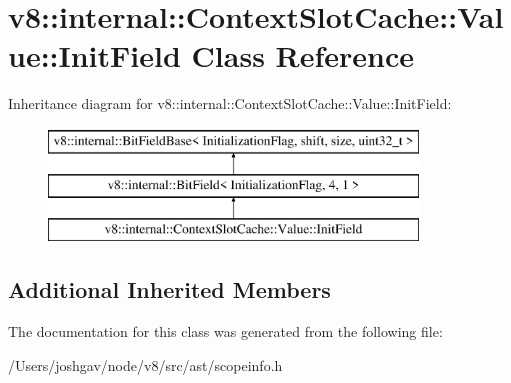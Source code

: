 \hypertarget{classv8_1_1internal_1_1_context_slot_cache_1_1_value_1_1_init_field}{}\section{v8\+:\+:internal\+:\+:Context\+Slot\+Cache\+:\+:Value\+:\+:Init\+Field Class Reference}
\label{classv8_1_1internal_1_1_context_slot_cache_1_1_value_1_1_init_field}
Inheritance diagram for v8\+:\+:internal\+:\+:Context\+Slot\+Cache\+:\+:Value\+:\+:Init\+Field\+:\begin{figure}[H]
\begin{center}
\leavevmode
\includegraphics[height=3.000000cm]{classv8_1_1internal_1_1_context_slot_cache_1_1_value_1_1_init_field}
\end{center}
\end{figure}
\subsection*{Additional Inherited Members}


The documentation for this class was generated from the following file\+:\begin{DoxyCompactItemize}
\item 
/\+Users/joshgav/node/v8/src/ast/scopeinfo.\+h\end{DoxyCompactItemize}
